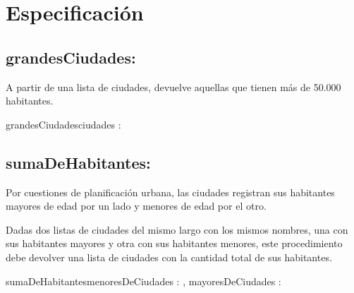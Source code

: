 \documentclass[10pt,a4paper]{article}
\begin{document}
\maketitle
\section{Especificación}


\subsection{grandesCiudades:}

A partir de una lista de ciudades, devuelve aquellas que tienen más de 50.000 habitantes.

\begin{proc}{grandesCiudades}{\In ciudades : \TLista{\str\times\ent}}{\TLista{\str\times\ent}}
\end{proc}


\subsection{sumaDeHabitantes:}

Por cuestiones de planificación urbana, las ciudades registran sus habitantes mayores de edad por un lado y menores de edad por el otro.

Dadas dos listas de ciudades del mismo largo con los mismos nombres, una con sus habitantes mayores y otra con sus habitantes menores, este procedimiento debe devolver una lista de ciudades con la cantidad total de sus habitantes.

\begin{proc}{sumaDeHabitantes}{\In menoresDeCiudades : \TLista{\str\times\ent}, \In mayoresDeCiudades : \TLista{\str\times\ent}}{\TLista{\str\times\ent}}
\end{proc}
\end{document}
